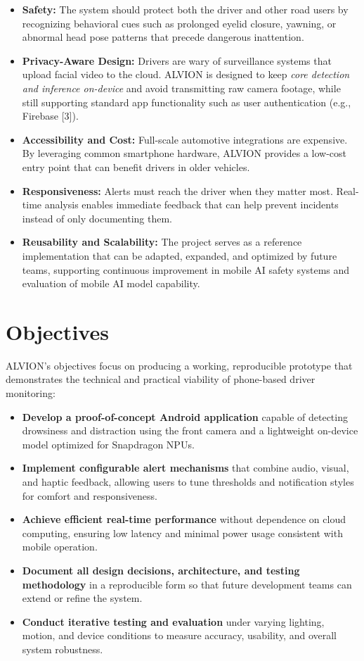 \documentclass[11pt]{report}
\begin{document}
\begin{itemize}
    \item \textbf{Safety:} The system should protect both the driver and other road users by recognizing behavioral cues such as prolonged eyelid closure, yawning, or abnormal head pose patterns that precede dangerous inattention.
    \item \textbf{Privacy-Aware Design:} Drivers are wary of surveillance systems that upload facial video to the cloud. ALVION is designed to keep \emph{core detection and inference on-device} and avoid transmitting raw camera footage, while still supporting standard app functionality such as user authentication (e.g., Firebase [3]).
    \item \textbf{Accessibility and Cost:} Full-scale automotive integrations are expensive. By leveraging common smartphone hardware, ALVION provides a low-cost entry point that can benefit drivers in older vehicles.
    \item \textbf{Responsiveness:} Alerts must reach the driver when they matter most. Real-time analysis enables immediate feedback that can help prevent incidents instead of only documenting them.
    \item \textbf{Reusability and Scalability:} The project serves as a reference implementation that can be adapted, expanded, and optimized by future teams, supporting continuous improvement in mobile AI safety systems and evaluation of mobile AI model capability.
\end{itemize}
\clearpage

\section{Objectives}
ALVION’s objectives focus on producing a working, reproducible prototype that demonstrates the technical and practical viability of phone-based driver monitoring:

\begin{itemize}
  \item \textbf{Develop a proof-of-concept Android application} capable of detecting drowsiness and distraction using the front camera and a lightweight on-device model optimized for Snapdragon NPUs.
  \item \textbf{Implement configurable alert mechanisms} that combine audio, visual, and haptic feedback, allowing users to tune thresholds and notification styles for comfort and responsiveness.
  \item \textbf{Achieve efficient real-time performance} without dependence on cloud computing, ensuring low latency and minimal power usage consistent with mobile operation.
  \item \textbf{Document all design decisions, architecture, and testing methodology} in a reproducible form so that future development teams can extend or refine the system.
  \item \textbf{Conduct iterative testing and evaluation} under varying lighting, motion, and device conditions to measure accuracy, usability, and overall system robustness.
\end{itemize}
\end{document}
